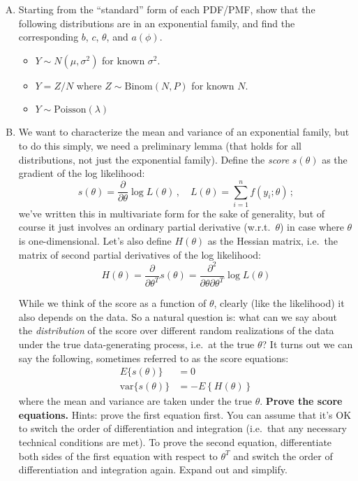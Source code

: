 \documentclass{mynotes}
\begin{document}
\begin{enumerate}[(A)]

\item Starting from the ``standard'' form of each PDF/PMF, show that the following distributions are in an exponential family, and find the corresponding $b$, $c$, $\theta$, and $a(\phi)$.  

\begin{itemize}
\item $Y \sim N(\mu, \sigma^2)$ for known $\sigma^2$.  
\item $Y = Z/N$ where $Z \sim \mbox{Binom}(N, P)$ for known $N$.   
\item $Y \sim \mbox{Poisson}(\lambda)$  
\end{itemize}

\item We want to characterize the mean and variance of an exponential family, but to do this simply, we need a preliminary lemma (that holds for all distributions, not just the exponential family).  Define the \emph{score} $s(\theta)$ as the gradient of the log likelihood:
$$
s(\theta) = \frac{\partial}{\partial \theta} \log L(\theta) \, , \quad L(\theta) = \sum_{i=1}^n f(y_i; \theta) \, ;
$$
we've written this in multivariate form for the sake of generality, but of course it just involves an ordinary partial derivative (w.r.t.~$\theta$) in case where $\theta$ is one-dimensional.  Let's also define $H(\theta)$ as the Hessian matrix, i.e.~the matrix of second partial derivatives of the log likelihood:
$$
H(\theta) = \frac{\partial}{\partial \theta^T} s(\theta) =   \frac{\partial^2}{ \partial \theta \partial \theta^T} \log L(\theta)
$$

While we think of the score as a function of $\theta$, clearly (like the likelihood) it also depends on the data.  So a natural question is: what can we say about the \emph{distribution} of the score over different random realizations of the data under the true data-generating process, i.e.~at the true $\theta$?  It turns out we can say the following, sometimes referred to as the score equations:  
$$
\begin{aligned}
E\{ s(\theta) \} &= 0 \\
\mbox{var} \{ s(\theta) \} &= - E \left\{ H(\theta) \right\}
\end{aligned}
$$
where the mean and variance are taken under the true $\theta$.  \textbf{Prove the score equations.}  Hints: prove the first equation first.  You can assume that it's OK to switch the order of differentiation and integration (i.e.~that any necessary technical conditions are met).  To prove the second equation, differentiate both sides of the first equation with respect to $\theta^T$ and switch the order of differentiation and integration again.  Expand out and simplify.  


\end{enumerate}
\end{document}

